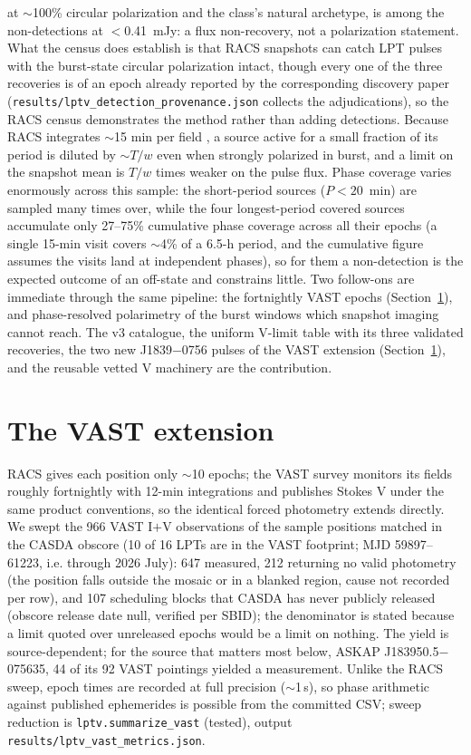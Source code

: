 \documentclass[twocolumn]{aastex631}
\newcommand{\code}[1]{\texttt{#1}}
\begin{document}
at $\sim$100\% circular polarization \citep{chime1634} and the class's natural archetype, is
among the non-detections at $<$0.41~mJy: a flux non-recovery, not a polarization statement.
What the census does establish is that RACS snapshots can catch LPT pulses with the
burst-state circular polarization intact, though every one of the three recoveries is of
an epoch already reported by the corresponding discovery paper
(\code{results/lptv\_detection\_provenance.json} collects the adjudications), so the RACS census
demonstrates the method rather than adding detections. Because RACS integrates $\sim$15 min per field
\citep{mcconnell2020}, a source active for a small fraction of its period is diluted by
$\sim T/w$ even when strongly polarized in burst, and a limit on the snapshot mean is $T/w$
times weaker on the pulse flux. Phase coverage varies enormously across this sample: the
short-period sources ($P<20$~min) are sampled many times over, while the four longest-period
covered sources accumulate only 27--75\% cumulative phase coverage across all their epochs
(a single 15-min visit covers $\sim$4\% of a 6.5-h period, and the cumulative figure assumes
the visits land at independent phases), so for them a non-detection is the expected
outcome of an off-state and constrains little. Two follow-ons are immediate through the same
pipeline: the fortnightly VAST epochs (Section~\ref{sec:vast}), and phase-resolved
polarimetry of the burst windows which snapshot imaging cannot reach. The v3
catalogue, the uniform V-limit table with its three validated recoveries, the two new
J1839$-$0756 pulses of the VAST extension (Section~\ref{sec:vast}), and the reusable
vetted V machinery are the contribution.

\section{The VAST extension}
\label{sec:vast}
RACS gives each position only $\sim$10 epochs; the VAST survey \citep{murphy2021} monitors
its fields roughly fortnightly with 12-min integrations and publishes Stokes V under the
same product conventions, so the identical forced photometry extends directly. We swept the
966 VAST I$+$V observations of the sample positions matched in the CASDA obscore (10 of 16
LPTs are in the VAST footprint; MJD 59897--61223, i.e. through 2026 July): 647 measured,
212 returning no valid photometry (the position falls outside the mosaic or in a blanked
region, cause not recorded per row), and 107 scheduling blocks that CASDA has
never publicly released (obscore release date null, verified per SBID); the denominator
is stated because a limit quoted over unreleased epochs would be a limit on nothing. The
yield is source-dependent; for the source that matters most below, ASKAP
J183950.5$-$075635, 44 of its 92 VAST pointings yielded a measurement. Unlike the RACS sweep, epoch times are
recorded at full precision ($\sim$1\,s), so phase arithmetic against published ephemerides
is possible from the committed CSV; sweep reduction is \code{lptv.summarize\_vast}
(tested), output \code{results/lptv\_vast\_metrics.json}.
\end{document}
